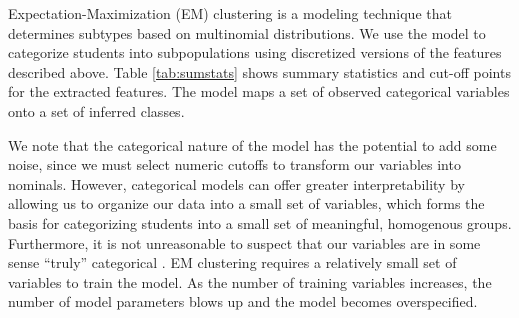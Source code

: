 \documentclass{edm_template}
\begin{document}
Expectation-Maximization (EM) clustering is a modeling technique that determines subtypes based on multinomial distributions. We use the model to categorize students into subpopulations using discretized versions of the features described above. Table \ref{tab:sumstats} shows summary statistics and cut-off points for the extracted features. The model maps a set of observed categorical variables onto a set of inferred classes. 

We note that the categorical nature of the model has the potential to add some noise, since we must select numeric cutoffs to transform our variables into nominals. However, categorical models can offer greater interpretability by allowing us to organize our data into a small set of variables, which forms the basis for categorizing students into a small set of meaningful, homogenous groups. Furthermore, it is not unreasonable to suspect that our variables are in some sense ``truly'' categorical \cite[pp8--9]{Collins2009}. EM clustering requires a relatively small set of variables to train the model. As the number of training variables increases, the number of model parameters blows up and the model becomes overspecified.


\end{document}
